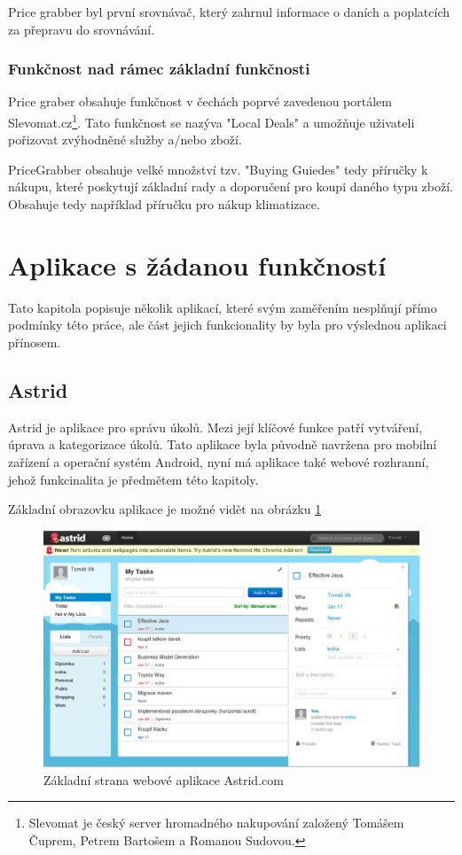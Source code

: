 Price grabber byl první srovnávač, který zahrnul informace o daních a poplatcích za přepravu do srovnávání. \cite{website:wiki:pricegrabber}

\subsubsection{Funkčnost nad rámec základní funkčnosti}
Price graber obsahuje funkčnost v čechách poprvé zavedenou portálem Slevomat.cz\footnote{Slevomat je český server hromadného nakupování založený Tomášem Čuprem, Petrem Bartošem a Romanou Sudovou.}. Tato funkčnost se nazýva "Local Deals" a umožňuje uživateli pořizovat zvýhodněné služby a/nebo zboží.

PriceGrabber obsahuje velké množství tzv. "Buying Guiedes" tedy příručky k nákupu, které poskytují základní rady a doporučení pro koupi daného typu zboží. Obsahuje tedy například příručku pro nákup klimatizace.

\section{Aplikace s žádanou funkčností}
Tato kapitola popisuje několik aplikací, které svým zaměřením nesplňují přímo podmínky této práce, ale část jejich funkcionality by byla pro výslednou aplikaci přínosem.

\subsection{Astrid}
Astrid je aplikace pro správu úkolů. Mezi její klíčové funkce patří vytváření, úprava a kategorizace úkolů. Tato aplikace byla původně navržena pro mobilní zařízení a operační systém Android, nyní má aplikace také webové rozhranní, jehož funkcinalita je předmětem této kapitoly.

Základní obrazovku aplikace je možné vidět na obrázku \ref{fig:astrid}

\begin{figure}[htb]
\begin{center}
\includegraphics[width=130mm]{./pictures/astrid.png}
\caption{Základní strana webové aplikace Astrid.com}
\label{fig:astrid}
\end{center}
\end{figure}

